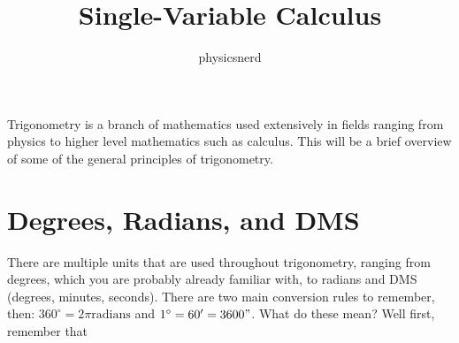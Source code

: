 \documentclass[12pt]{article}
\title{Single-Variable Calculus}
\author{physicsnerd}
\begin{document}
\maketitle
\tableofcontents

Trigonometry is a branch of mathematics used extensively in fields ranging from physics to higher level mathematics such as calculus. This will be a brief overview of some of the general principles of trigonometry.

\section{Degrees, Radians, and DMS}
There are multiple units that are used throughout trigonometry, ranging from degrees, which you are probably already familiar with, to radians and DMS (degrees, minutes, seconds). There are two main conversion rules to remember, then: $360^{\circ} = 2\pi \text{radians}$ and $1^{\circ}=60'=3600"$. What do these mean? Well first, remember that
\end{document}
